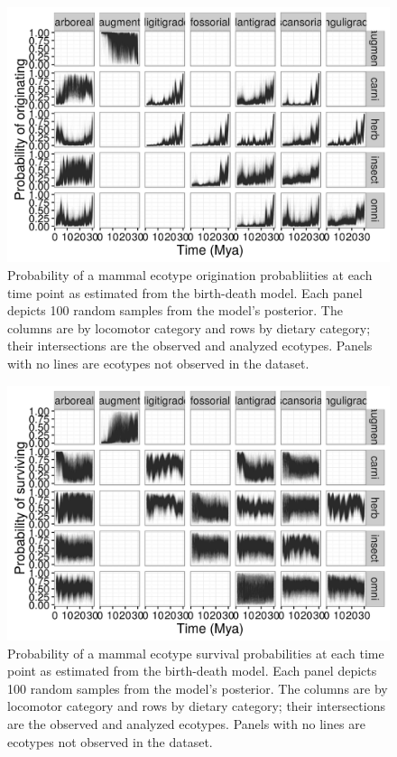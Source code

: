 \documentclass[12pt,letterpaper]{article}
\begin{document}
\begin{figure}[ht]
  \centering
  \includegraphics[width=\textwidth,height=0.8\textheight,keepaspectratio=true]{figure/ecotype_origin_bd}
  \caption[Ecotype origination probability estimated from the birth-death model]{Probability of a mammal ecotype origination probabliities at each time point as estimated from the birth-death model. Each panel depicts 100 random samples from the model's posterior. The columns are by locomotor category and rows by dietary category; their intersections are the observed and analyzed ecotypes. Panels with no lines are ecotypes not observed in the dataset.}
  \label{fig:eco_origin}
\end{figure}

\begin{figure}[ht]
  \centering
  \includegraphics[width=\textwidth,height=0.8\textheight,keepaspectratio=true]{figure/ecotype_survival_bd}
  \caption[Ecotype survival probability estimated from the birth-death model]{Probability of a mammal ecotype survival probabilities at each time point as estimated from the birth-death model. Each panel depicts 100 random samples from the model's posterior. The columns are by locomotor category and rows by dietary category; their intersections are the observed and analyzed ecotypes. Panels with no lines are ecotypes not observed in the dataset.}
  \label{fig:eco_survival}
\end{figure}
\end{document}
